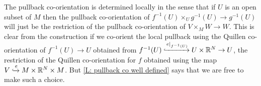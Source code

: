 \begin{remark}\label{R: local pullback co-orientations}
	The pullback co-orientation is determined locally in the sense that if $U$ is an open subset of $M$ then the pullback co-orientation of $f^{-1}(U) \times_U g^{-1}(U) \to g^{-1}(U)$ will just be the restriction of the pullback co-orientation of $V \times_M W \to W$.
	This is clear from the construction if we co-orient the local pullback using the Quillen co-orientation of $f^{-1}(U) \to U$ obtained from $f^{-1}(U) \xhookrightarrow{e|_{f^{-1}(U)}} U \times \mathbb{R}^N \to U$, the restriction of the Quillen co-orientation for $f$ obtained using the map $V\xhookrightarrow{e}M \times \mathbb{R}^N \times M$.
	But \cref{L: pullback co well defined} says that we are free to make such a choice.
\end{remark}

